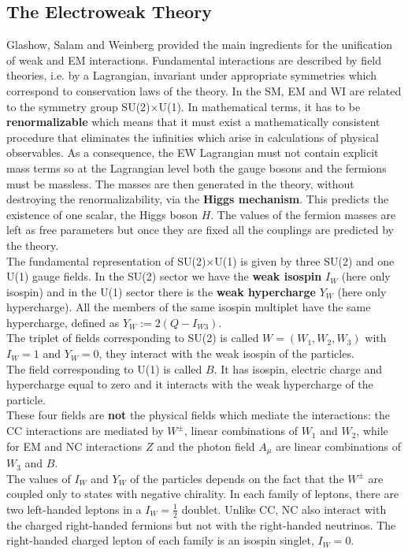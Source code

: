 \documentclass[10.75pt,a4paper,openright,bottom=2cm]{article}
\begin{document}
\subsection{The Electroweak Theory}
Glashow, Salam and Weinberg provided the main ingredients for the unification of weak and EM interactions. Fundamental interactions are described by field theories, i.e. by a Lagrangian, invariant under appropriate symmetries which correspond to conservation laws of the theory. In the SM, EM and WI are related to the symmetry group SU(2)$\times$U(1). In mathematical terms, it has to be \textbf{renormalizable} which means that it must exist a mathematically consistent procedure that eliminates the infinities which arise in calculations of physical observables. As a consequence, the EW Lagrangian must not contain explicit mass terms so at the Lagrangian level both the gauge bosons and the fermions must be massless. The masses are then generated in the theory, without destroying the renormalizability, via the \textbf{Higgs mechanism}. This predicts the existence of one scalar, the Higgs boson $H$. The values of the fermion masses are left as free parameters but once they are fixed all the couplings are predicted by the theory.\\
The fundamental representation of SU(2)$\times$U(1) is given by three SU(2) and one U(1) gauge fields. In the SU(2) sector we have the \textbf{weak isospin} $I_W$ (here only isospin) and in the U(1) sector there is the \textbf{weak hypercharge} $Y_W$ (here only hypercharge). All the members of the same isospin multiplet have the same hypercharge, defined as $Y_W:=2(Q-I_{W3})$.\\
The triplet of fields corresponding to SU(2) is called $W=(W_1,W_2,W_3)$ with $I_W=1$ and $Y_W=0$, they interact with the weak isospin of the particles.\\
The field corresponding to U(1) is called $B$. It has isospin, electric charge and hypercharge equal to zero and it interacts with the weak hypercharge of the particle.\\
These four fields are \textbf{not} the physical fields which mediate the interactions: the CC interactions are mediated by $W^\pm$, linear combinations of $W_1$ and $W_2$, while for EM and NC interactions $Z$ and the photon field $A_\mu$ are linear combinations of $W_3$ and $B$.\\
The values of $I_W$ and $Y_W$ of the particles depends on the fact that the $W^\pm$ are coupled only to states with negative chirality. In each family of leptons, there are two left-handed leptons in a $I_W=\frac{1}{2}$ doublet. Unlike CC, NC also interact with the charged right-handed fermions but not with the right-handed neutrinos. The right-handed charged lepton of each family is an isospin singlet, $I_W=0$.\\
\end{document}

